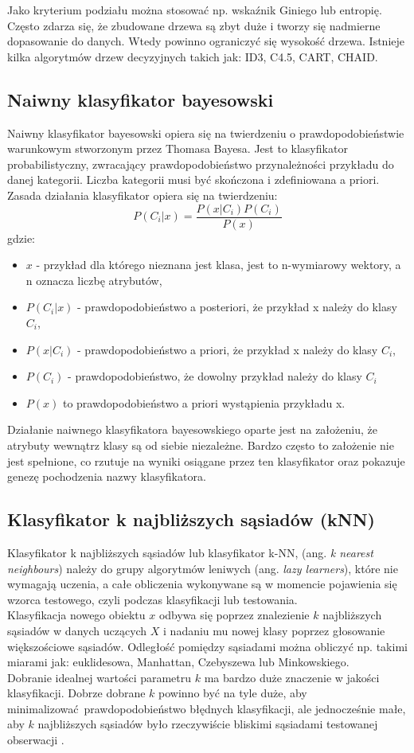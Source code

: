 Jako kryterium podziału można stosować np. wskaźnik Giniego lub entropię. Często zdarza się, że zbudowane drzewa są zbyt duże i tworzy się nadmierne dopasowanie do danych. Wtedy powinno ograniczyć się wysokość drzewa.
Istnieje kilka algorytmów drzew decyzyjnych takich jak: ID3, C4.5, CART, CHAID. 
\subsection{Naiwny klasyfikator bayesowski}
Naiwny klasyfikator bayesowski opiera się na twierdzeniu o prawdopodobieństwie warunkowym stworzonym przez Thomasa Bayesa. Jest to klasyfikator probabilistyczny, zwracający prawdopodobieństwo przynależności przykładu do danej kategorii. Liczba kategorii musi być skończona i zdefiniowana a priori. Zasada działania klasyfikator opiera się na twierdzeniu:
\[P(C_i|x) = \frac{P(x|C_i)P(C_i)}{P(x)}\]
gdzie:
\begin{itemize}
	\item $x$ - przykład dla którego nieznana jest klasa, jest to n-wymiarowy wektory, a n oznacza liczbę atrybutów,  
	\item $P(C_i|x)$ - prawdopodobieństwo a posteriori, że przykład x należy do klasy $C_i$,
	\item $P(x|C_i)$ - prawdopodobieństwo a priori, że przykład x należy do klasy $C_i$,
	\item $P(C_i)$ - prawdopodobieństwo, że dowolny przykład należy do klasy $C_i$
	\item $P(x)$ to prawdopodobieństwo a priori wystąpienia przykładu x.
\end{itemize}
Działanie naiwnego klasyfikatora bayesowskiego oparte jest na założeniu, że atrybuty wewnątrz klasy są od siebie niezależne. Bardzo często to założenie nie jest spełnione, co rzutuje na wyniki osiągane przez ten klasyfikator oraz pokazuje genezę pochodzenia nazwy klasyfikatora.
\subsection{Klasyfikator k najbliższych sąsiadów (kNN)}
Klasyfikator k najbliższych sąsiadów lub klasyfikator k-NN, (ang. \textit{k nearest neighbours}) należy do grupy algorytmów leniwych (ang. \textit{lazy learners}), które nie wymagają uczenia, a całe obliczenia wykonywane są w momencie pojawienia się wzorca testowego, czyli podczas klasyfikacji lub testowania. \\
Klasyfikacja nowego obiektu $x$ odbywa się poprzez znalezienie $k$ najbliższych sąsiadów w danych uczących $X$ i nadaniu mu nowej klasy poprzez głosowanie większościowe sąsiadów. Odległość pomiędzy sąsiadami można obliczyć np. takimi miarami jak: euklidesowa, Manhattan, Czebyszewa lub Minkowskiego. \\
Dobranie idealnej wartości parametru $k$ ma bardzo duże znaczenie w jakości klasyfikacji. Dobrze dobrane $k$ powinno być na tyle duże, aby minimalizować prawdopodobieństwo błędnych klasyfikacji, ale jednocześnie małe, aby $k$ najbliższych sąsiadów było rzeczywiście bliskimi sąsiadami testowanej obserwacji \cite{Bishop}. 
